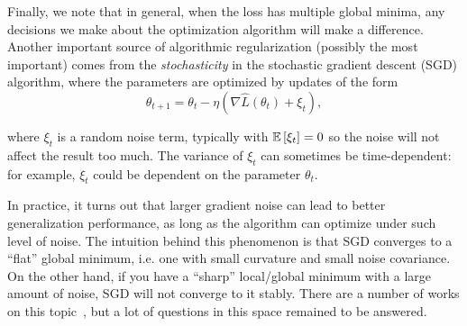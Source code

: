 Finally, we note that in general, when the loss has multiple global minima, any decisions we make about the optimization algorithm will make a difference. Another important source of algorithmic regularization (possibly the most important) comes from the \textit{stochasticity} in the stochastic gradient descent (SGD) algorithm, where the parameters are optimized by updates of the form
\begin{equation}
\theta_{t+1} = \theta_t - \eta(\nabla\hat{L}(\theta_t) + \xi_t),
\end{equation}

where $\xi_t$ is a random noise term, typically with $\operatorname*{\mathbb{E}}\left[\xi_t\right]=0$ so the noise will not affect the result too much. The variance of $\xi_t$ can sometimes be time-dependent: for example, $\xi_t$ could be dependent on the parameter $\theta_t$. 

In practice, it turns out that larger gradient noise can lead to better generalization performance, as long as the algorithm can optimize under such level of noise. The intuition behind this phenomenon is that SGD converges to a ``flat'' global minimum, i.e. one with small curvature and small noise covariance. On the other hand, if you have a ``sharp'' local/global minimum with a large amount of noise, SGD will not converge to it stably. There are a number of works on this topic~\cite{haochen2020shape,blanc2020implicit}, but a lot of questions in this space remained to be answered.
